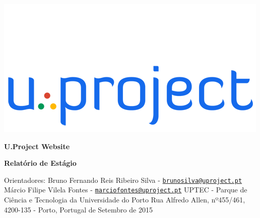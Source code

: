 \documentclass[11pt]{report}
\begin{document}
\thispagestyle{empty}

\begin{center}
	
	\includegraphics [scale=0.5]{uplogo500.png}
	\linebreak \linebreak \linebreak \linebreak \linebreak
	\linebreak \linebreak \linebreak \linebreak \linebreak
	\begin{Huge}
		\textbf{U.Project Website} \linebreak \linebreak
	\end{Huge}
	\begin{Large}
		\textbf{Relatório de Estágio} \linebreak \linebreak
	\end{Large}
	\linebreak
	\linebreak
	\linebreak
	\linebreak
	\linebreak
	\linebreak
	Orientadores:
	\linebreak
	\linebreak
	Bruno Fernando Reis Ribeiro Silva - \href{mailto: brunosilva@uproject.pt}{\texttt{brunosilva@uproject.pt}}
	\linebreak
	Márcio Filipe Vilela Fontes - \href{mailto: marciofontes@uproject.pt}{\texttt{marciofontes@uproject.pt}}
	\linebreak
	\linebreak
	\linebreak
	\linebreak
	UPTEC - Parque de Ciência e Tecnologia da Universidade do Porto
	\linebreak
	Rua Alfredo Allen, nº455/461, 4200-135 - Porto, Portugal
	\linebreak
	\linebreak
	\linebreak
	 de Setembro de 2015
\end{center}
\end{document}
